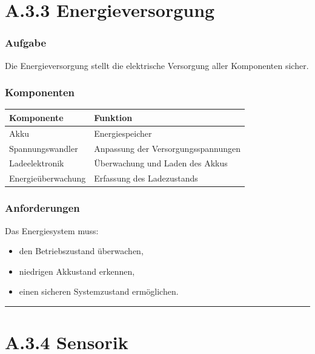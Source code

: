 \documentclass[
  a4paper,
  12pt,
  DIV=12,        %
  parskip=half,  %
  headings=small %
]{scrartcl}
\theoremstyle{definition}
\providecommand{\tightlist}{%
  \setlength{\itemsep}{0pt}\setlength{\parskip}{0pt}}
\theoremstyle{definition}
\providecommand{\tightlist}{%
  \setlength{\itemsep}{0pt}\setlength{\parskip}{0pt}}
\begin{document}
\section{A.3.3 Energieversorgung}\label{a.3.3-energieversorgung}

\subsubsection{Aufgabe}\label{aufgabe-2}

Die Energieversorgung stellt die elektrische Versorgung aller
Komponenten sicher.

\subsubsection{Komponenten}\label{komponenten-1}

\begin{longtable}[]{@{}ll@{}}
\toprule\noalign{}
Komponente & Funktion \\
\midrule\noalign{}
\endhead
\bottomrule\noalign{}
\endlastfoot
Akku & Energiespeicher \\
Spannungswandler & Anpassung der Versorgungsspannungen \\
Ladeelektronik & Überwachung und Laden des Akkus \\
Energieüberwachung & Erfassung des Ladezustands \\
\end{longtable}

\subsubsection{Anforderungen}\label{anforderungen-2}

Das Energiesystem muss:

\begin{itemize}
\tightlist
\item
  den Betriebszustand überwachen,
\item
  niedrigen Akkustand erkennen,
\item
  einen sicheren Systemzustand ermöglichen.
\end{itemize}

\begin{center}\rule{0.5\linewidth}{0.5pt}\end{center}

\section{A.3.4 Sensorik}\label{a.3.4-sensorik}
\end{document}
